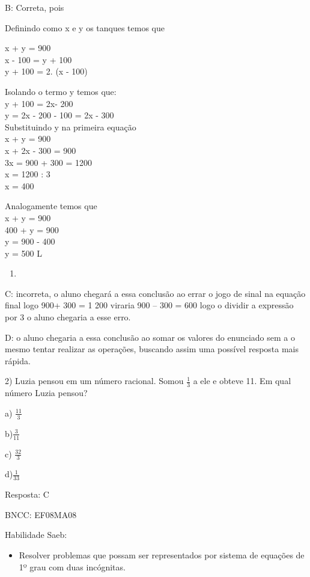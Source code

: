 B: Correta, pois

Definindo como x e y os tanques temos que

x + y = 900\\
x - 100 = y + 100\\
y + 100 = 2. (x - 100)

Isolando o termo y temos que:\\
y + 100 = 2x- 200\\
y = 2x - 200 - 100 = 2x - 300\\
Substituindo y na primeira equação\\
x + y = 900\\
x + 2x - 300 = 900\\
3x = 900 + 300 = 1200\\
x = 1200 : 3\\
x = 400

Analogamente temos que\\
x + y = 900\\
400 + y = 900\\
y = 900 - 400\\
y = 500 L

\begin{enumerate}
\def\labelenumi{\Alph{enumi}.}
\setcounter{enumi}{1}
\tightlist
\item
\end{enumerate}

C: incorreta, o aluno chegará a essa conclusão ao errar o jogo de sinal
na equação final logo 900+ 300 = 1 200 viraria 900 -- 300 = 600 logo o
dividir a expressão por 3 o aluno chegaria a esse erro.

D: o aluno chegaria a essa conclusão ao somar os valores do enunciado
sem a o mesmo tentar realizar as operações, buscando assim uma possível
resposta mais rápida.

2) Luzia pensou em um número racional. Somou \(\frac{1}{3}\) a ele e
obteve 11. Em qual número Luzia pensou?

a) \(\frac{11}{3}\)

b)\(\frac{3}{11}\)

c) \(\frac{32}{3}\)

d)\(\frac{1}{33}\)

Resposta: C

BNCC: EF08MA08

Habilidade Saeb:

\begin{itemize}
\tightlist
\item
  Resolver problemas que possam ser representados por sistema de
  equações de 1º grau com duas incógnitas.
\end{itemize}


